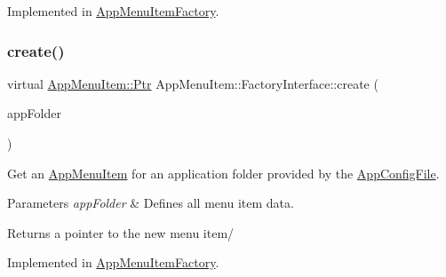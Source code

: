 Implemented in \mbox{\hyperlink{classAppMenuItemFactory_a6b77c85063b587a6f5930fa9e94908eb}{App\+Menu\+Item\+Factory}}.

\mbox{\label{classAppMenuItem_1_1FactoryInterface_a3b9ef458047ad7c8c5bbae6157466f6c}} 
\subsubsection{\texorpdfstring{create()}{create()}\hspace{0.1cm}{\footnotesize\ttfamily [3/3]}}
{\footnotesize\ttfamily virtual \mbox{\hyperlink{classAppMenuItem_ab5f51c5d74f8df62b8862c0cc8126cb7}{App\+Menu\+Item\+::\+Ptr}} App\+Menu\+Item\+::\+Factory\+Interface\+::create (\begin{DoxyParamCaption}\item[{const \mbox{\hyperlink{structAppConfigFile_1_1AppFolder}{App\+Config\+File\+::\+App\+Folder}} \&}]{app\+Folder }\end{DoxyParamCaption})\hspace{0.3cm}{\ttfamily [pure virtual]}}

Get an \mbox{\hyperlink{classAppMenuItem}{App\+Menu\+Item}} for an application folder provided by the \mbox{\hyperlink{classAppConfigFile}{App\+Config\+File}}.


\begin{DoxyParams}{Parameters}
{\em app\+Folder} & Defines all menu item data.\\
\hline
\end{DoxyParams}
\begin{DoxyReturn}{Returns}
a pointer to the new menu item/ 
\end{DoxyReturn}


Implemented in \mbox{\hyperlink{classAppMenuItemFactory_a39e1a6e96d7c22413cb396a46b496804}{App\+Menu\+Item\+Factory}}.

\mbox{\label{classAppMenuItem_1_1FactoryInterface_a6d222242bf0a7cbb28f150c41d92fd7a}} 
